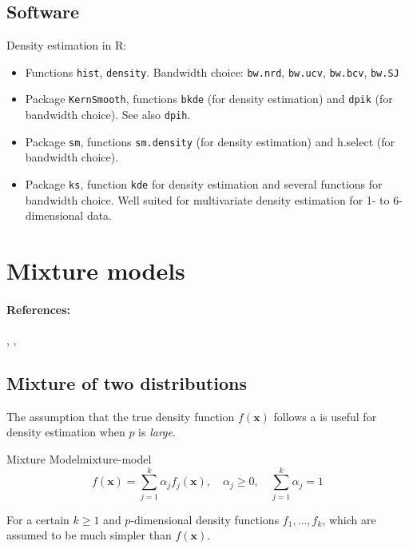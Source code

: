 \subsection{Software}
Density estimation in R:
\begin{itemize}
	\item Functions \texttt{hist}, \texttt{density}. Bandwidth choice: \texttt{bw.nrd}, \texttt{bw.ucv},
	      \texttt{bw.bcv}, \texttt{bw.SJ}
	\item Package \texttt{KernSmooth}, functions \texttt{bkde} (for density estimation) and
	      \texttt{dpik} (for bandwidth choice). See also \texttt{dpih}. \cite{wand_kernel_1994}
	\item Package \texttt{sm}, functions \texttt{sm.density} (for density estimation) and
	      h.select (for bandwidth choice). \cite{bowman_applied_1997}
	\item Package \texttt{ks}, function \texttt{kde} for density estimation and several
	      functions for bandwidth choice. Well suited for multivariate density
	      estimation for 1- to 6-dimensional data. \cite{chacon_multivariate_2018}
\end{itemize}

\clearpage
\section{Mixture models}
\paragraph{References:} \cite[Sections 6.8 and 12.7]{hastie_elements_2009}, \cite[Section 13.1.3]{fan_statistical_2020}, \cite[Chapter 10]{lange_numerical_1999}

\subsection{Mixture of two distributions}

The assumption that the true density function $f(\boldsymbol{x})$ follows
a  is useful for density estimation when $p$ is \emph{large}.

\begin{definition}{Mixture Model}{mixture-model}
	\begin{equation*}
		f(\boldsymbol{x}) = \sum_{j=1}^k \alpha_j f_j(\boldsymbol{x}),\quad \alpha_j \geq 0,\quad \sum_{j=1}^k \alpha_j = 1
	\end{equation*}

	For a certain $k \geq 1$ and $p$-dimensional density functions $f_1, \dots, f_k$,
	which are assumed to be much simpler than $f(\boldsymbol{x})$.
\end{definition}


